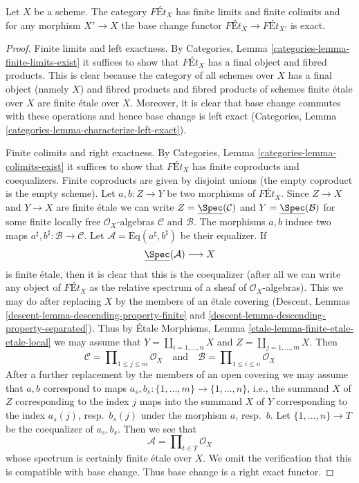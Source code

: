 \begin{lemma}
\label{lemma-finite-etale-covers-limits-colimits}
Let $X$ be a scheme. The category $\textit{F\'Et}_X$ has finite limits and
finite colimits and for any morphism $X' \to X$ the base change functor
$\textit{F\'Et}_X \to \textit{F\'Et}_{X'}$ is exact.
\end{lemma}

\begin{proof}
Finite limits and left exactness. By
Categories, Lemma \ref{categories-lemma-finite-limits-exist}
it suffices to show that $\textit{F\'Et}_X$ has a final object
and fibred products. This is clear because the category of
all schemes over $X$ has a final object (namely $X$) and fibred products
and fibred products of schemes finite \'etale over $X$ are
finite \'etale over $X$. Moreover, it is clear that base
change commutes with these operations and hence base change
is left exact (Categories, Lemma
\ref{categories-lemma-characterize-left-exact}).

\medskip\noindent
Finite colimits and right exactness. By
Categories, Lemma \ref{categories-lemma-colimits-exist}
it suffices to show that $\textit{F\'Et}_X$ has finite
coproducts and coequalizers. Finite coproducts are given
by disjoint unions (the empty coproduct is the empty scheme).
Let $a, b : Z \to Y$ be two morphisms of $\textit{F\'Et}_X$.
Since $Z \to X$ and $Y \to X$ are finite \'etale we can write
$Z = \underline{\Spec}(\mathcal{C})$ and $Y = \underline{\Spec}(\mathcal{B})$
for some finite locally free $\mathcal{O}_X$-algebras $\mathcal{C}$
and $\mathcal{B}$. The morphisms $a, b$ induce two maps
$a^\sharp, b^\sharp : \mathcal{B} \to \mathcal{C}$.
Let $\mathcal{A} = \text{Eq}(a^\sharp, b^\sharp)$ be their
equalizer. If
$$
\underline{\Spec}(\mathcal{A}) \longrightarrow X
$$
is finite \'etale, then it is clear that this is the coequalizer
(after all we can write any object of $\textit{F\'Et}_X$
as the relative spectrum of a sheaf of $\mathcal{O}_X$-algebras).
This we may do after replacing $X$ by the members of an \'etale
covering (Descent, Lemmas \ref{descent-lemma-descending-property-finite}
and \ref{descent-lemma-descending-property-separated}).
Thus by \'Etale Morphisms, Lemma \ref{etale-lemma-finite-etale-etale-local}
we may assume that
$Y = \coprod_{i = 1, \ldots, n} X$ and $Z = \coprod_{j = 1, \ldots, m} X$.
Then
$$
\mathcal{C} = \prod\nolimits_{1 \leq j \leq m} \mathcal{O}_X
\quad\text{and}\quad
\mathcal{B} = \prod\nolimits_{1 \leq i \leq n} \mathcal{O}_X
$$
After a further replacement by the members of an open covering
we may assume that $a, b$ correspond to
maps $a_s, b_s : \{1, \ldots, m\} \to \{1, \ldots, n\}$, i.e.,
the summand $X$ of $Z$ corresponding to the index $j$ maps into
the summand $X$ of $Y$ corresponding to the index $a_s(j)$, resp.\ $b_s(j)$
under the morphism $a$, resp.\ $b$.
Let $\{1, \ldots, n\} \to T$ be the coequalizer of $a_s, b_s$.
Then we see that
$$
\mathcal{A} = \prod\nolimits_{t \in T} \mathcal{O}_X
$$
whose spectrum is certainly finite \'etale over $X$. We
omit the verification that this is compatible with base change.
Thus base change is a right exact functor.
\end{proof}

